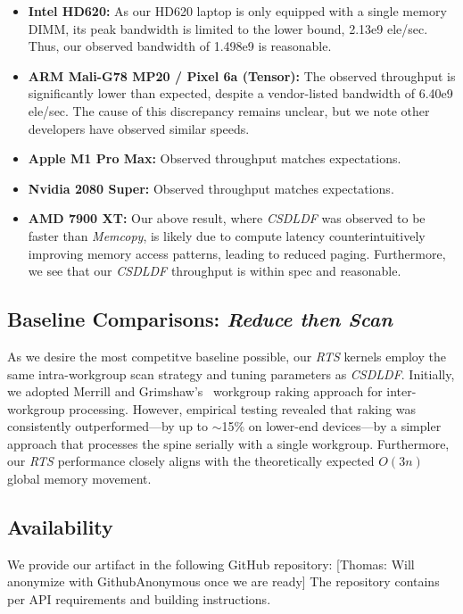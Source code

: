 \documentclass[sigconf]{acmart}
\newcommand{\thomas}[1]{{\footnotesize\color{orange}[Thomas: #1]}}
\begin{document}
\begin{itemize}
  \item \textbf{Intel HD620:} As our HD620 laptop is only equipped with a single memory DIMM, its peak bandwidth is limited to the lower bound, 2.13e9 ele/sec. Thus, our observed bandwidth of 1.498e9 is reasonable.
  \item \textbf{ARM Mali-G78 MP20 / Pixel 6a (Tensor):} The observed throughput is significantly lower than expected, despite a vendor-listed bandwidth of 6.40e9 ele/sec. The cause of this discrepancy remains unclear, but we note other developers have observed similar speeds.
  \item \textbf{Apple M1 Pro Max:} Observed throughput matches expectations.
  \item \textbf{Nvidia 2080 Super:} Observed throughput matches expectations.
  \item \textbf{AMD 7900 XT:} Our above result, where \emph{CSDLDF} was observed to be faster than \emph{Memcopy}, is likely due to compute latency counterintuitively improving memory access patterns, leading to reduced paging. Furthermore, we see that our \emph{CSDLDF} throughput is within spec and reasonable.
\end{itemize}

\subsection{Baseline Comparisons: \emph{Reduce then Scan}}
\label{sec:rts}
As we desire the most competitve baseline possible, our \emph{RTS} kernels employ the same intra-workgroup scan strategy and tuning parameters as \emph{CSDLDF}. Initially, we adopted Merrill and Grimshaw's~\cite{Merrill2009} workgroup raking approach for inter-workgroup processing. However, empirical testing revealed that raking was consistently outperformed—by up to $\sim$15\% on lower-end devices—by a simpler approach that processes the spine serially with a single workgroup. Furthermore, our \emph{RTS} performance closely aligns with the theoretically expected $O(3n)$ global memory movement.

\subsection{Availability}
We provide our artifact in the following GitHub repository:
\thomas{Will anonymize with GithubAnonymous once we are ready}
The repository contains per API requirements and building instructions.



\end{document}
